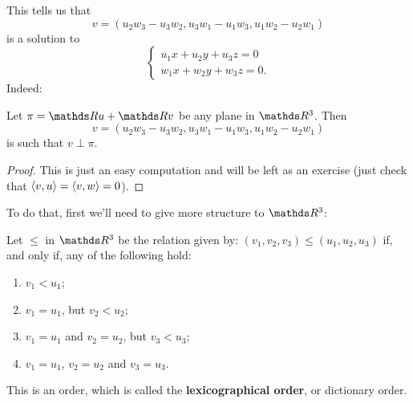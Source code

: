 This tells us that
\[v=(u_2w_3-u_3w_2,u_3w_1-u_1w_3,u_1w_2-u_2w_1)\]is a solution to
\[\begin{cases}
u_1x+u_2y+u_3z=0\\
w_1x+w_2y+w_3z=0.
\end{cases}\]Indeed:

\begin{lemma}
	Let $\pi=\R u+\R v$ be any plane in $\R^3$. Then $$v=(u_2w_3-u_3w_2,u_3w_1-u_1w_3,u_1w_2-u_2w_1)$$ is such that $v\perp \pi$.
\end{lemma}
\begin{proof}
	This is just an easy computation and will be left as an exercise (just check that $\langle v,u\rangle=\langle v,w\rangle=0$).
\end{proof}

\bigskip
To do that, first we'll need to give more structure to $\R^3$:

\begin{df}
	Let $\leq$ in $\R^3$ be the relation given by: $(v_1,v_2,v_3)\leq (u_1,u_2,u_3)$ if, and only if, any of the following hold:
	\begin{enumerate}[(1)]		
		\item $v_1< u_1$;
		\item $v_1=u_1$, but $v_2< u_2$;
		\item $v_1=u_1$ and $v_2=u_2$, but $v_3< u_3$;
		\item $v_1=u_1$, $v_2=u_2$ and $v_3=u_3$.
	\end{enumerate}

	This is an order, which is called the \textbf{lexicographical order}, or dictionary order.
\end{df}

